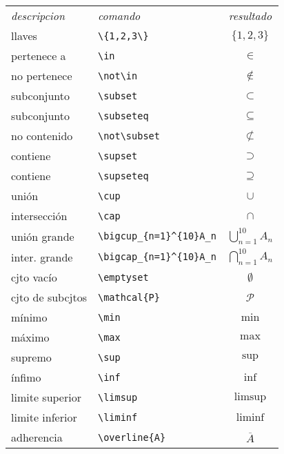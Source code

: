 \documentclass[10pt,landscape]{article}
\begin{document}
\begin{multicols}{3}
\begin{tabular}{llc}
\emph{descripcion} & \emph{comando} & \emph{resultado}\\
llaves & \verb!\{1,2,3\}! & $\{1,2,3\}$\\
pertenece a & \verb!\in! & $\in$\\
no pertenece  & \verb!\not\in! & $\not\in$\\
subconjunto  & \verb!\subset! & $\subset$\\
subconjunto   & \verb!\subseteq! & $\subseteq$\\
no contenido  & \verb!\not\subset! & $\not\subset$\\
contiene  & \verb!\supset! & $\supset$\\
contiene  & \verb!\supseteq! & $\supseteq$\\
unión & \verb!\cup! & $\cup$\\
intersección & \verb!\cap! & $\cap$\\
unión grande & 
\verb!\bigcup_{n=1}^{10}A_n! &
$\displaystyle \bigcup_{n=1}^{10}A_{n}$\\
inter. grande & \verb!\bigcap_{n=1}^{10}A_n! &$\displaystyle \bigcap_{n=1}^{10}A_{n}$\\
cjto vacío & \verb!\emptyset! & $\emptyset$\\
cjto de subcjtos & \verb!\mathcal{P}! & $\mathcal{P}$\\
mínimo & \verb!\min! & $\min$\\
máximo & \verb!\max! & $\max$\\
supremo & \verb!\sup! & $\sup$\\
ínfimo & \verb!\inf! & $\inf$\\
limite superior & \verb!\limsup! & $\limsup$\\
limite inferior & \verb!\liminf! & $\liminf$\\
adherencia & \verb!\overline{A}! & $\overline{A}$
\end{tabular}


\end{multicols}
\end{document}
